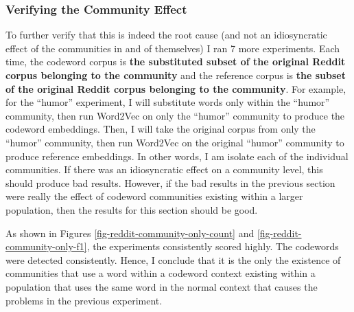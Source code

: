 \newpage

\subsubsection{Verifying the Community Effect}

To further verify that this is indeed the root cause (and not an idiosyncratic effect of the communities in and of themselves) I ran 7 more experiments. Each time, the codeword corpus is \textbf{the substituted subset of the original Reddit corpus belonging to the community} and the reference corpus is \textbf{the subset of the original Reddit corpus belonging to the community}. For example, for the ``humor'' experiment, I will substitute words only within the ``humor'' community, then run Word2Vec on only the ``humor'' community to produce the codeword embeddings. Then, I will take the original corpus from only the ``humor'' community, then run Word2Vec on the original ``humor'' community to produce reference embeddings. In other words, I am isolate each of the individual communities. If there was an idiosyncratic effect on a community level, this should produce bad results. However, if the bad results in the previous section were really the effect of codeword communities existing within a larger population, then the results for this section should be good.

As shown in Figures \ref{fig-reddit-community-only-count} and \ref{fig-reddit-community-only-f1}, the experiments consistently scored highly. The codewords were detected consistently. Hence, I conclude that it is the only the existence of communities that use a word within a codeword context existing within a population that uses the same word in the normal context that causes the problems in the previous experiment.

